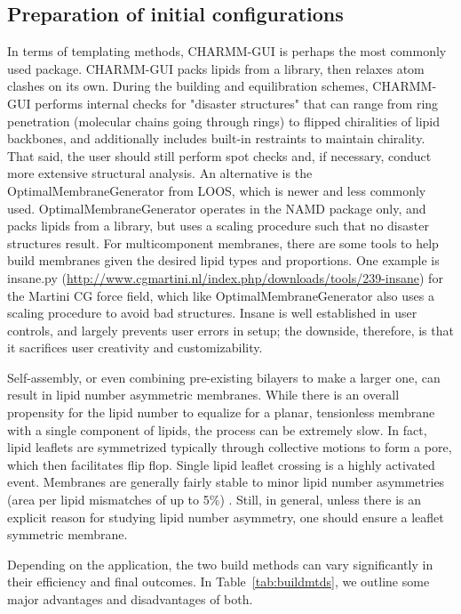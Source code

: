 \documentclass[9pt,bestpractices]{livecoms}
\begin{document}
\subsection{Preparation of initial configurations}
\label{subsec:prepconf4}

\parbox{8.5cm}{\sloppy
In terms of templating methods, CHARMM-GUI is perhaps the most commonly used package.
CHARMM-GUI packs lipids from a library, then relaxes atom clashes on its own.
During the building and equilibration schemes, CHARMM-GUI performs internal checks for "disaster structures" that can range from ring penetration (molecular chains going through rings) to flipped chiralities of lipid backbones, and additionally includes built-in restraints to maintain chirality.
That said, the user should still perform spot checks and, if necessary, conduct more extensive structural analysis.
An alternative is the OptimalMembraneGenerator from LOOS, which is newer and less commonly used.
OptimalMembraneGenerator operates in the NAMD package only, and packs lipids from a library, but uses a scaling procedure such that no disaster structures result.
For multicomponent membranes, there are some tools to help build membranes given the desired lipid types and proportions.
One example is insane.py \cite{Wassenaar2015a} (\url{http://www.cgmartini.nl/index.php/downloads/tools/239-insane}) for the Martini CG force field, which like OptimalMembraneGenerator also uses a scaling procedure to avoid bad structures.
Insane is well established in user controls, and largely prevents user errors in setup; the downside, therefore, is that it sacrifices user creativity and customizability.}

Self-assembly, or even combining pre-existing bilayers to make a larger one, can result in lipid number asymmetric membranes.
While there is an overall propensity for the lipid number to equalize for a planar, tensionless membrane with a single component of lipids, the process can be extremely slow.
In fact, lipid leaflets are symmetrized typically through collective motions to form a pore, which then facilitates flip flop.
Single lipid leaflet crossing is a highly activated event.
Membranes are generally fairly stable to minor lipid number asymmetries (area per lipid mismatches of up to 5\%) \cite{Park2015a}.
Still, in general, unless there is an explicit reason for studying lipid number asymmetry, one should ensure a leaflet symmetric membrane.

Depending on the application, the two build methods can vary significantly in their efficiency and final outcomes.
In Table~\ref{tab:buildmtds}, we outline some major advantages and disadvantages of both.
\end{document}
